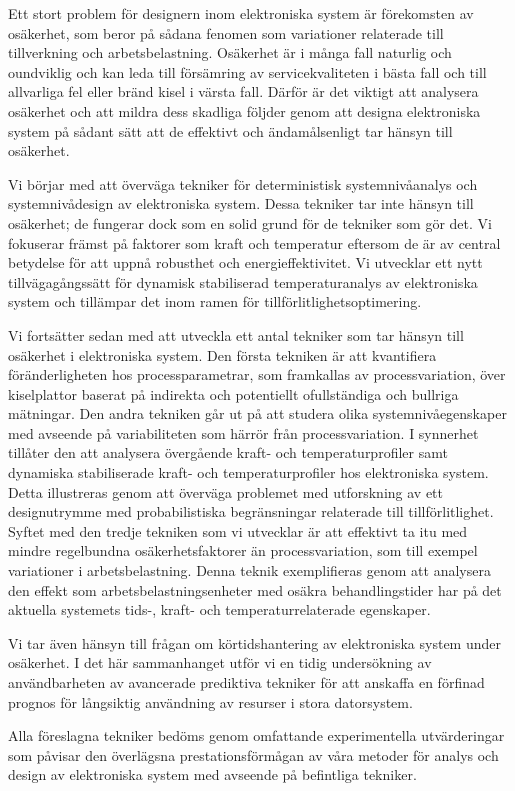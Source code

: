 Ett stort problem för designern inom elektroniska system är förekomsten av
osäkerhet, som beror på sådana fenomen som variationer relaterade till
tillverkning och arbetsbelastning. Osäkerhet är i många fall naturlig och
oundviklig och kan leda till försämring av servicekvaliteten i bästa fall och
till allvarliga fel eller bränd kisel i värsta fall. Därför är det viktigt att
analysera osäkerhet och att mildra dess skadliga följder genom att designa
elektroniska system på sådant sätt att de effektivt och ändamålsenligt tar
hänsyn till osäkerhet.

Vi börjar med att överväga tekniker för deterministisk systemnivåanalys och
systemnivådesign av elektroniska system. Dessa tekniker tar inte hänsyn till
osäkerhet; de fungerar dock som en solid grund för de tekniker som gör det. Vi
fokuserar främst på faktorer som kraft och temperatur eftersom de är av central
betydelse för att uppnå robusthet och energieffektivitet. Vi utvecklar ett nytt
tillvägagångssätt för dynamisk stabiliserad temperaturanalys av elektroniska
system och tillämpar det inom ramen för tillförlitlighetsoptimering.

Vi fortsätter sedan med att utveckla ett antal tekniker som tar hänsyn till
osäkerhet i elektroniska system. Den första tekniken är att kvantifiera
föränderligheten hos processparametrar, som framkallas av processvariation, över
kiselplattor baserat på indirekta och potentiellt ofullständiga och bullriga
mätningar. Den andra tekniken går ut på att studera olika systemnivåegenskaper
med avseende på variabiliteten som härrör från processvariation. I synnerhet
tillåter den att analysera övergående kraft- och temperaturprofiler samt
dynamiska stabiliserade kraft- och temperaturprofiler hos elektroniska system.
Detta illustreras genom att överväga problemet med utforskning av ett
designutrymme med probabilistiska begränsningar relaterade till
tillförlitlighet. Syftet med den tredje tekniken som vi utvecklar är att
effektivt ta itu med mindre regelbundna osäkerhetsfaktorer än processvariation,
som till exempel variationer i arbetsbelastning. Denna teknik exemplifieras
genom att analysera den effekt som arbetsbelastningsenheter med osäkra
behandlingstider har på det aktuella systemets tids-, kraft- och
temperaturrelaterade egenskaper.

Vi tar även hänsyn till frågan om körtidshantering av elektroniska system under
osäkerhet. I det här sammanhanget utför vi en tidig undersökning av
användbarheten av avancerade prediktiva tekniker för att anskaffa en förfinad
prognos för långsiktig användning av resurser i stora datorsystem.

Alla föreslagna tekniker bedöms genom omfattande experimentella utvärderingar
som påvisar den överlägsna prestationsförmågan av våra metoder för analys och
design av elektroniska system med avseende på befintliga tekniker.

